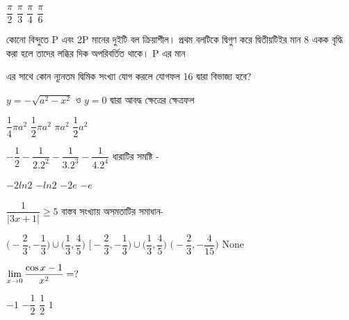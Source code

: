 \documentclass[addpoints]{exam}
\begin{document}
\begin{questions}
\begin{oneparchoices}
\choice $ \dfrac{\pi}{2} $
\choice $ \dfrac{\pi}{3} $
\choice $ \dfrac{\pi}{4} $
\choice $ \dfrac{\pi}{6} $

\end{oneparchoices}

\question কোনো বিন্দুতে P এবং 2P মানের দুইটি বল ক্রিয়াশীল। প্রথম বলটিকে দ্বিগুণ করে দ্বিতীয়টিইর মান 8 একক বৃদ্ধি করা হলে তাদের লব্ধির দিক অপরিবর্তিত থাকে। P এর মান

\begin{oneparchoices}
\end{oneparchoices}

 এর সাথে কোন ন্যূনতম দ্বিমিক সংখ্যা যোগ করলে যোগফল 16 দ্বারা বিভাজ্য হবে?

\begin{oneparchoices}

\end{oneparchoices}


\question $ y=-\sqrt{a^2 -x^2} $  ও $ y = 0$ দ্বারা আবদ্ধ ক্ষেত্রের ক্ষেত্রফল

\begin{oneparchoices}
\choice $ \dfrac{1}{4}\pi a^2 $
\choice $ \dfrac{1}{2}\pi a^2 $
\choice $ \pi a^2 $
\choice $ \dfrac{1}{2}a^2 $
\end{oneparchoices}

\question $ -\dfrac{1}{2} - \dfrac{1}{2.2^{2}} -\dfrac{1}{3.2^3} - \dfrac{1}{4.2^{4}} $ ধারাটির সমষ্টি -

\begin{oneparchoices}
\choice $ -2 ln2  $
\choice $ -ln 2 $
\choice $ -2e $
\choice $ -e $
\end{oneparchoices}

\question  $ \dfrac{1}{|3x+1|}\ge 5 $ বাস্তব সংখ্যায় অসমতাটির সমাধান-

\begin{oneparchoices}
\choice $ \Big(-\dfrac{2}{3}, -\dfrac{1}{3}\Big)\cup \Big(\dfrac{1}{3}, \dfrac{4}{5}\Big)  $
\choice $ \Big[-\dfrac{2}{3}, -\dfrac{1}{3}\Big)\cup \Big(\dfrac{1}{3}, \dfrac{4}{5}\Big)  $
\choice $ \Big(-\dfrac{2}{3}, -\dfrac{4}{15}\Big)$
\choice None

\end{oneparchoices}

\question  $ \mathlarger{\lim_{x\to 0} \dfrac{\cos x -1}{x^{2}} = ?} $

\begin{oneparchoices}
\choice $ -1 $
\choice $ -\dfrac{1}{2} $
\choice $ \dfrac{1}{2} $
\choice  $ 1 $


\end{oneparchoices}
\end{questions}
\end{document}
